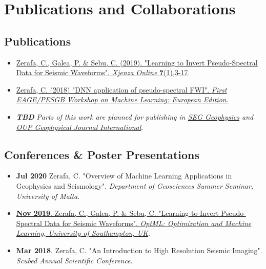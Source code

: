 \chapter{Publications and Collaborations}

\section{Publications}
\begin{itemize}
    \item[] \href{https://www.xjenza.org/JOURNAL/OLD/7-1-2019/07.pdf}{Zerafa, C., Galea, P. \& Sebu, C. (2019). "Learning to Invert Pseudo-Spectral Data for Seismic Waveforms". \textit{Xjenza Online} \textbf{7}(1),3-17}.
    \item[] \href{https://www.earthdoc.org/content/papers/10.3997/2214-4609.201803015}{Zerafa, C. (2018) "DNN application of pseudo-spectral FWI". \textit{First EAGE/PESGB Workshop on Machine Learning: European Edition.}}
    \item[] \textbf{\textit{TBD}} \emph{Parts of this work are planned for publishing in \href{https://library.seg.org/journal/gpysa7}{SEG Geophysics} and \href{https://academic.oup.com/gji}{OUP Geophysical Journal International}}.
\end{itemize}

\section{Conferences \& Poster Presentations}
\begin{itemize}
    \item \textbf{Jul 2020} Zerafa, C. "Overview of Machine Learning Applications in Geophysics and Seismology". \textit{Department of Geosciences Summer Seminar, University of Malta}.
    \item \href{https://www.southampton.ac.uk/the-alan-turing-institute/news/events/2019/10/optimization-and-machine-learning.page}{\textbf{Nov 2019}. Zerafa, C., Galea, P. \& Sebu, C. "Learning to Invert Pseudo-Spectral Data for Seismic Waveforms". \textit{OptML: Optimization and Machine Learning, University of Southampton, UK}}.
    \item \textbf{Mar 2018}. Zerafa, C. "An Introduction to High Resolution Seismic Imaging". \textit{Scubed Annual Scientific Conference}.
\end{itemize}

